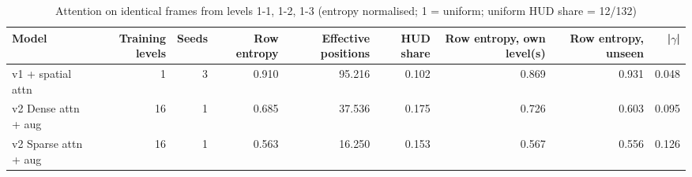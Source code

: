 \begin{table}[t]
\centering
\caption{Attention on identical frames from levels 1-1, 1-2, 1-3 (entropy normalised; 1 = uniform; uniform HUD share = 12/132)}
\label{tab:attention_shared_frames}
\begin{tabular}{lrrrrrrrr}
\toprule
Model & Training levels & Seeds & Row entropy & Effective positions & HUD share & Row entropy, own level(s) & Row entropy, unseen & |$\gamma$| \\
\midrule
v1 + spatial attn & 1 & 3 & 0.910 & 95.216 & 0.102 & 0.869 & 0.931 & 0.048 \\
v2 Dense attn + aug & 16 & 1 & 0.685 & 37.536 & 0.175 & 0.726 & 0.603 & 0.095 \\
v2 Sparse attn + aug & 16 & 1 & 0.563 & 16.250 & 0.153 & 0.567 & 0.556 & 0.126 \\
\bottomrule
\end{tabular}
\end{table}
